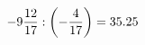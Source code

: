 \documentclass[preview]{standalone}
\begin{document}
\begin{align*}
-9 { 12 \over 17 }  :  \left( - { 4 \over 17 } \right) = 35.25
\end{align*}
\end{document}
